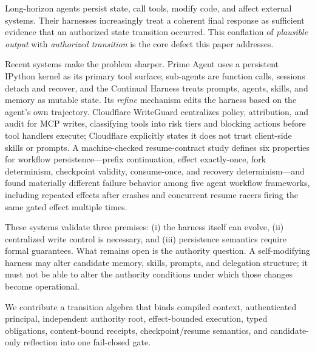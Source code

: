 Long-horizon agents persist state, call tools, modify code, and affect
external systems. Their harnesses increasingly treat a coherent final
response as sufficient evidence that an authorized state transition
occurred. This conflation of \emph{plausible output} with \emph{authorized
transition} is the core defect this paper addresses.

Recent systems make the problem sharper. Prime Agent \cite{prime_agent}
uses a persistent IPython kernel as its primary tool surface; sub-agents are
function calls, sessions detach and recover, and the Continual Harness
treats prompts, agents, skills, and memory as mutable state. Its
\emph{refine} mechanism edits the harness based on the agent's own
trajectory. Cloudflare WriteGuard \cite{writeguard} centralizes policy,
attribution, and audit for MCP writes, classifying tools into risk tiers and
blocking actions before tool handlers execute; Cloudflare explicitly states
it does not trust client-side skills or prompts. A machine-checked
resume-contract study \cite{resume_contract} defines six properties for
workflow persistence---prefix continuation, effect exactly-once, fork
determinism, checkpoint validity, consume-once, and recovery
determinism---and found materially different failure behavior among five
agent workflow frameworks, including repeated effects after crashes and
concurrent resume racers firing the same gated effect multiple times.

These systems validate three premises: (i) the harness itself can evolve,
(ii) centralized write control is necessary, and (iii) persistence semantics
require formal guarantees. What remains open is the authority question. A
self-modifying harness may alter candidate memory, skills, prompts, and
delegation structure; it must not be able to alter the authority conditions
under which those changes become operational.

We contribute a transition algebra that binds compiled context,
authenticated principal, independent authority root, effect-bounded
execution, typed obligations, content-bound receipts, checkpoint/resume
semantics, and candidate-only reflection into one fail-closed gate.

